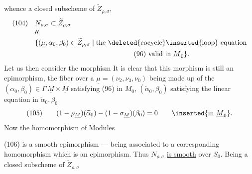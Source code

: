 whence a closed subscheme of $\widetilde Z_{\rho,\sigma}$,
\[
\begin{aligned}
(104)\quad&N_{\rho,\sigma}\subset\widetilde Z_{\rho,\sigma}\\[-2pt]
&\prime\prime\\[-2pt]
&\{(\underline\mu,\alpha_0,\beta_0)\in\widetilde Z_{\rho,\sigma}\mid
\text{the \deleted{cocycle}\inserted{loop} equation}\\
&\hspace{5cm}\text{(96) valid in }\underline M_0\}.
\end{aligned}
\]
Let us then consider the morphism
It is clear that this morphism is still an epimorphism, the fiber over a
$\underline\mu=(\nu_2,\nu_3,\nu_0)$ being made up of the
$(\alpha_0,\beta_0)\in\Gamma\,\underline M\times\underline M$
satisfying (96) in $M_0$,
$(\widetilde\alpha_0,\beta_0)$ satisfying the linear equation
in $\widetilde\alpha_0,\beta_0$
\[
(105)\qquad
(1-\rho_{\underline M})(\widetilde\alpha_0)
-(1-\sigma_{\underline M})(\beta_0)=0
\qquad\inserted{\text{in }\underline M_0}.
\]
Now the homomorphism of Modules

(106)
is a smooth epimorphism --- being associated to a corresponding homomorphism
which is  an epimorphism.
Thus  $N_{\rho,\sigma}$ \uline{is smooth} over $S_0$.
 Being a closed subscheme of $\widetilde Z_{\rho,\sigma}$


